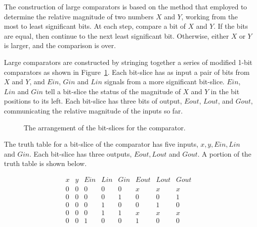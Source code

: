 The construction of large comparators is based on the method that 
employed to determine the relative magnitude of two numbers $X$
and $Y$, working from the most to least significant
bits.  At each step, compare a bit of $X$ and $Y$.  If the bits
are equal, then continue to the next least significant bit.  Otherwise,
either $X$ or $Y$ is larger, and the comparison is over.

Large comparators are constructed by stringing together a series
of modified 1-bit comparators as shown in Figure~\ref{fig:Compare}.  
Each bit-slice has as input a pair 
of bits from $X$ and $Y$, and $Ein$, $Gin$ and $Lin$ signals from a
more significant bit-slice.  $Ein$, $Lin$ and $Gin$ tell a bit-slice the 
status of the magnitude of $X$ and $Y$ in the bit positions to
its left.  Each bit-slice has three bits of output, $Eout$, $Lout$, and 
$Gout$, communicating the relative magnitude of the inputs so far.

\begin{figure}[ht]
\caption{The arrangement of the bit-slices for the comparator.}
\label{fig:Compare}
\end{figure}

The truth table for a bit-slice of the comparator has five inputs, 
$x, y, Ein, Lin$ and $Gin$.  Each bit-slice has three outputs, 
$Eout, Lout$ and $Gout$.  A portion of the truth table is shown below.

$$\begin{array}{c|c|c|c|c||c|c|c}
x & y & Ein & Lin & Gin & Eout & Lout & Gout	\\ \hline
0 & 0 & 0   & 0   & 0 	& x    & x    & x	\\ \hline
0 & 0 & 0   & 0   & 1 	& 0    & 0    & 1	\\ \hline
0 & 0 & 0   & 1   & 0 	& 0    & 1    & 0	\\ \hline
0 & 0 & 0   & 1   & 1 	& x    & x    & x	\\ \hline
0 & 0 & 1   & 0   & 0 	& 1    & 0    & 0	\\
\end{array}$$

